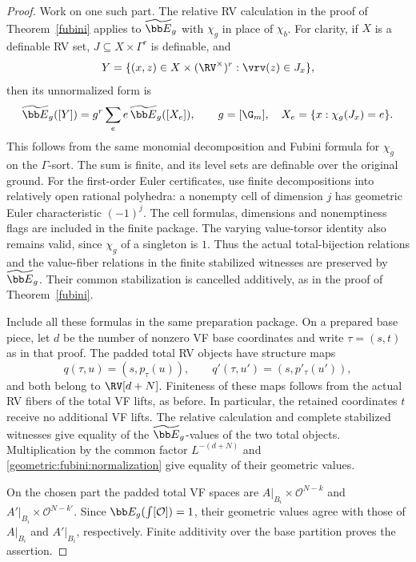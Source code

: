 \begin{proof}
Work on one such part. The relative RV calculation in the proof of
Theorem~\ref{fubini} applies to $\widetilde{\bb E}_g$ with $\chi_g$ in place of $\chi_b$.
For clarity, if $X$ is a definable RV set,
$J\subseteq X\times\Gamma^r$ is definable, and
\[
 Y=\{(x,z)\in X\times(\RV^\times)^r:\vrv(z)\in J_x\},
\]
then its unnormalized form is
\begin{equation}\label{geometric:fubini:push}
 \widetilde{\bb E}_g([Y])=g^r\sum_e e\,\widetilde{\bb E}_g([X_e]),\qquad
 g=[\G_m],\quad X_e=\{x:\chi_g(J_x)=e\}.
\end{equation}
This follows from the same monomial decomposition and Fubini formula
for $\chi_g$ on the $\Gamma$-sort. The sum is finite, and its level sets are definable over the
original ground. For the first-order Euler certificates, use finite
decompositions into relatively open rational polyhedra: a nonempty
cell of dimension $j$ has geometric Euler characteristic $(-1)^j$.
The cell formulas, dimensions and nonemptiness flags are included in
the finite package. The varying value-torsor identity also remains valid,
since $\chi_g$ of a singleton is $1$. Thus the actual total-bijection
relations and the value-fiber relations in the finite stabilized
witnesses are preserved by $\widetilde{\bb E}_g$. Their common stabilization is
cancelled additively, as in the proof of Theorem~\ref{fubini}.

Include all these formulas in the same preparation package. On a
prepared base piece, let $d$ be the number of nonzero VF base coordinates
and write $\tau=(s,t)$ as in that proof. The padded total RV objects have
structure maps
\[
 q(\tau,u)=(s,p_\tau(u)),\qquad
 q'(\tau,u')=(s,p'_\tau(u')),
\]
and both belong to $\RV[d+N]$. Finiteness of these maps follows from the
actual RV fibers of the total VF lifts, as before. In particular, the
retained coordinates $t$ receive no additional VF lifts. The relative
calculation and complete stabilized witnesses give equality of the
$\widetilde{\bb E}_g$-values of the two total objects. Multiplication by the common
factor $L^{-(d+N)}$ and \eqref{geometric:fubini:normalization} give equality of their
geometric values.

On the chosen part the padded total VF spaces are
$A|_{B_i}\times\mathcal O^{N-k}$ and $A'|_{B_i}\times\mathcal O^{N-k'}$.
Since $\bb E_g(\int[\mathcal O])=1$, their geometric values agree with those of
$A|_{B_i}$ and $A'|_{B_i}$, respectively. Finite additivity over the base
partition proves the assertion.
\end{proof}

